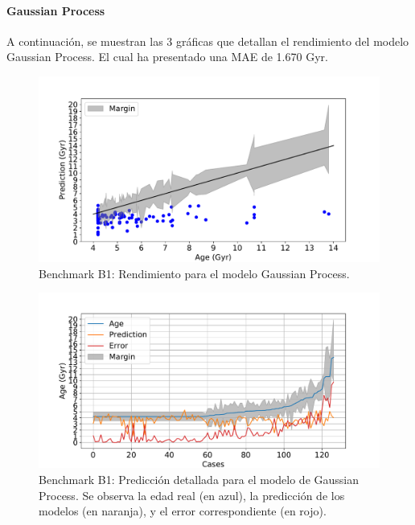 \paragraph{Gaussian Process} 
A continuación, se muestran las 3 gráficas que detallan el rendimiento del modelo Gaussian Process. El cual ha presentado una MAE de 1.670 Gyr.

\begin{figure}[H]
\begin{center}
 \includegraphics[width=0.8\linewidth]{Figuras/Experimentos/B_B1_gp_1.pdf}
\end{center}
\caption{Benchmark B1: Rendimiento para el modelo Gaussian Process.}
 \label{fig:benchB1_details_gp_1}
\end{figure}

\begin{figure}[H]
\begin{center}
 \includegraphics[width=0.8\linewidth]{Figuras/Experimentos/B_B1_gp_2.pdf}
\end{center}
\caption{Benchmark B1: Predicción detallada para el modelo de Gaussian Process. Se observa la edad real (en azul), la predicción de los modelos (en naranja), y el error correspondiente (en rojo).}
 \label{fig:benchB1_details_gp_2}
\end{figure}

